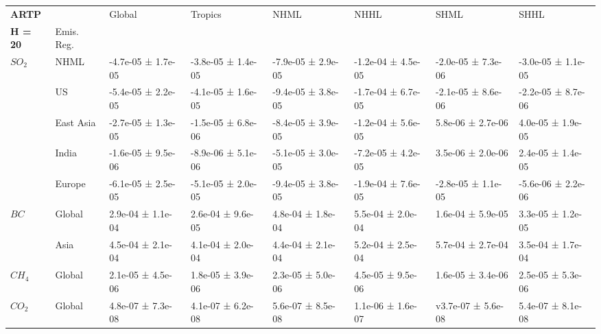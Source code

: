 \documentclass[preview]{standalone}
\newcommand{\nm}{\phantom{-}}
\begin{document}
    \tiny
    \begin{minipage}{\textwidth}
    	\setlength\tabcolsep{5pt}
    \begin{tabular}{llllllll}
\toprule
\textbf{ARTP}  &      &               Global  &              Tropics &                 NHML &                 NHHL &                 SHML &                 SHHL \\
\textbf{H = 20}      & Emis. Reg. &                      &                      &                      &                      &                      &                      \\
\midrule
$SO_2$ & NHML &  -4.7e-05 ±  1.7e-05 &  -3.8e-05 ±  1.4e-05 &  -7.9e-05 ±  2.9e-05 &  -1.2e-04 ±  4.5e-05 &  -2.0e-05 ±  7.3e-06 &  -3.0e-05 ±  1.1e-05 \\
       & US &  -5.4e-05 ±  2.2e-05 &  -4.1e-05 ±  1.6e-05 &  -9.4e-05 ±  3.8e-05 &  -1.7e-04 ±  6.7e-05 &  -2.1e-05 ±  8.6e-06 &  -2.2e-05 ±  8.7e-06 \\
       & East Asia &  -2.7e-05 ±  1.3e-05 &  -1.5e-05 ±  6.8e-06 &  -8.4e-05 ±  3.9e-05 &  -1.2e-04 ±  5.6e-05 &   5.8e-06 ±  2.7e-06 &   \nm4.0e-05 ±  1.9e-05 \\
       & India &  -1.6e-05 ±  9.5e-06 &  -8.9e-06 ±  5.1e-06 &  -5.1e-05 ±  3.0e-05 &  -7.2e-05 ±  4.2e-05 &   3.5e-06 ±  2.0e-06 &   \nm2.4e-05 ±  1.4e-05 \\
       & Europe &  -6.1e-05 ±  2.5e-05 &  -5.1e-05 ±  2.0e-05 &  -9.4e-05 ±  3.8e-05 &  -1.9e-04 ±  7.6e-05 &  -2.8e-05 ±  1.1e-05 &  -5.6e-06 ±  2.2e-06 \\
\cmidrule(lr){1-8}
$BC$ & Global &   \nm2.9e-04 ±  1.1e-04 &  \nm 2.6e-04 ±  9.6e-05 &   \nm4.8e-04 ±  1.8e-04 &   \nm5.5e-04 ±  2.0e-04 &   \nm1.6e-04 ±  5.9e-05 &   \nm3.3e-05 ±  1.2e-05 \\
       & Asia &   \nm4.5e-04 ±  2.1e-04 &   \nm4.1e-04 ±  2.0e-04 &   \nm4.4e-04 ±  2.1e-04 &   \nm5.2e-04 ±  2.5e-04 &   \nm5.7e-04 ±  2.7e-04 &   \nm3.5e-04 ±  1.7e-04 \\
\cmidrule(lr){1-8}
$CH_4$ & Global &   \nm2.1e-05 ±  4.5e-06 &   \nm1.8e-05 ±  3.9e-06 &  \nm2.3e-05 ±  5.0e-06 &   \nm4.5e-05 ±  9.5e-06 &   \nm1.6e-05 ±  3.4e-06 &   \nm2.5e-05 ±  5.3e-06 \\
\cmidrule(lr){1-8}
$CO_2$ & Global &   \nm4.8e-07 ±  7.3e-08 &   \nm4.1e-07 ±  6.2e-08 &   \nm5.6e-07 ±  8.5e-08 &   \nm1.1e-06 ±  1.6e-07 &   v3.7e-07 ±  5.6e-08 &   \nm5.4e-07 ±  8.1e-08 \\
\bottomrule
\end{tabular}

    \end{minipage}
    
\end{document}
